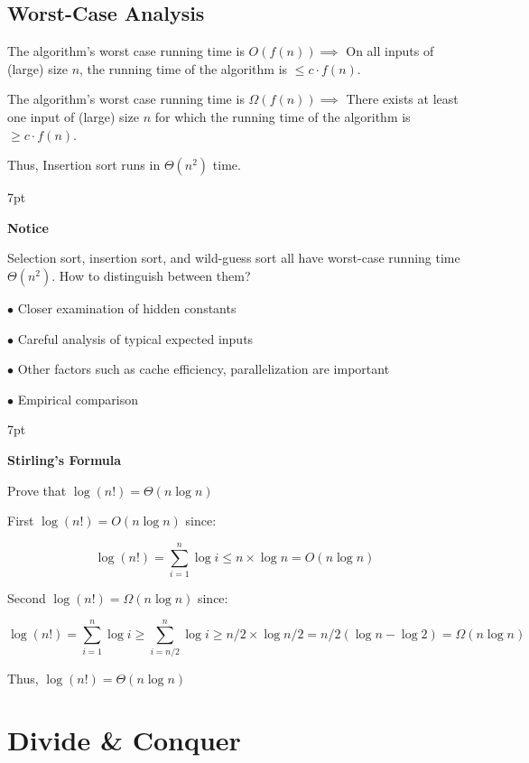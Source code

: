 \documentclass[10pt]{article}
\newenvironment{formal}[2]{%
	\def\FrameCommand{%
		\hspace{1pt}%
		{\color{#1}\vrule width 2pt}%
		{\color{#2}\vrule width 4pt}%
		\colorbox{#2}%
	}%
	\MakeFramed{\advance\hsize-\width\FrameRestore}%
	\noindent\hspace{-4.55pt}%
	\begin{adjustwidth}{}{7pt}%
		\vspace{2pt}\vspace{2pt}%
	}
	{%
		\vspace{2pt}\end{adjustwidth}\endMakeFramed%
}
\begin{document}
\subsection{Worst-Case Analysis}

The algorithm’s worst case running time is $O(f(n)) \implies $ On all inputs of (large) size $n$, the running time of the algorithm is $\leq c \cdot f(n)$.

The algorithm’s worst case running time is $\Omega (f(n)) \implies $ There exists at least one input of (large) size $n$ for which the running time of the algorithm is  $\geq c \cdot f(n)$.

Thus, Insertion sort runs in $\Theta (n^2)$ time.

\begin{formal}{DarkBlue}{blueshade}
	
	\textbf{Notice}
	
	Selection sort, insertion sort, and wild-guess sort all have worst-case running time $\Theta (n^2)$. How to distinguish between them?
	
	$\bullet$ Closer examination of hidden constants
	
	$\bullet$ Careful analysis of typical expected inputs
	
	$\bullet$ Other factors such as cache efficiency, parallelization are important
	
	$\bullet$ Empirical comparison
	
\end{formal}

\begin{formal}{DarkGreen}{greenshade}

	\textbf{Stirling's Formula}
	
	Prove that $\log (n!) = \Theta (n \log n)$
	
	First $\log (n!) = O (n \log n)$ since:
	
	$$
	\log (n!) = \sum_{i=1}^n \log i \leq n \times \log n = O (n \log n)
	$$

	Second $\log (n!) = \Omega (n \log n)$ since:
	
	$$
	\log (n!) = \sum_{i=1}^n \log i \geq \sum_{i=n/2}^n \log i \geq n/2 \times \log n/2 = n/2 (\log n - \log 2) = \Omega (n \log n)
	$$
	
	Thus, $\log (n!) = \Theta (n \log n)$

\end{formal}

\newpage

\section{Divide \& Conquer}
\end{document}

